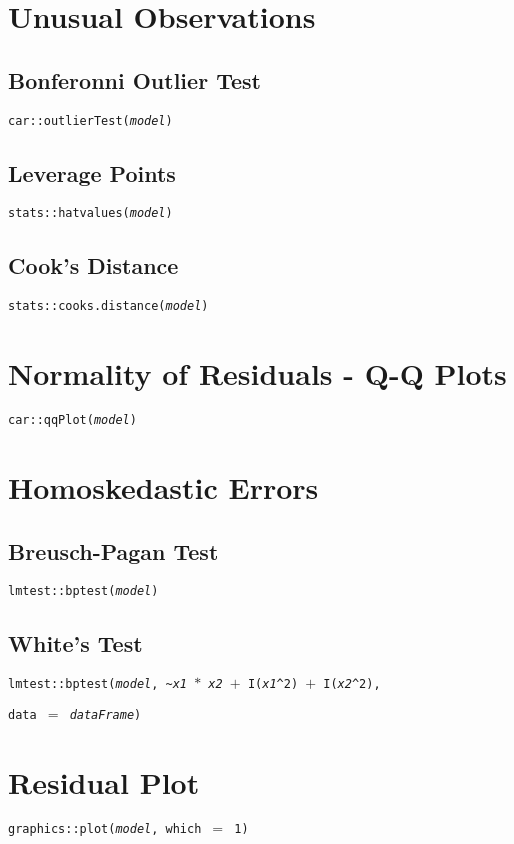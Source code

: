 \documentclass{tufte-handout}
\newenvironment{subs}
  {\adjustwidth{3em}{0pt}}
  {\endadjustwidth}
\begin{document}
\section{Unusual Observations}
\begin{subs}
\subsection{Bonferonni Outlier Test}
\noindent \texttt{car::}{\color{red}\texttt{outlierTest}}\texttt{(\textit{model})} 

\vspace{3mm}
\subsection{Leverage Points}
\noindent \texttt{stats::}{\color{red}\texttt{hatvalues}}\texttt{(\textit{model})} 

\vspace{3mm}
\subsection{Cook's Distance}
\noindent \texttt{stats::}{\color{red}\texttt{cooks.distance}}\texttt{(\textit{model})} 
\end{subs}

\vspace{5mm}
\section{Normality of Residuals - Q-Q Plots}
\noindent \texttt{car::}{\color{red}\texttt{qqPlot}}\texttt{(\textit{model})} 

\vspace{5mm}
\section{Homoskedastic Errors}
\begin{subs}
\subsection{Breusch-Pagan Test}
\noindent \texttt{lmtest::}{\color{red}\texttt{bptest}}\texttt{(\textit{model})} 

\vspace{3mm}
\subsection{White's Test}
\noindent \texttt{lmtest::}{\color{red}\texttt{bptest}}\texttt{(\textit{model}, \textasciitilde \textit{x1} $*$ \textit{x2} $+$ I(\textit{x1}\textasciicircum2) $+$ I(\textit{x2}\textasciicircum2),} 
\par \texttt{data $=$ \textit{dataFrame})}

\vspace{3mm}
\section{Residual Plot}
\noindent \texttt{graphics::}{\color{red}\texttt{plot}}\texttt{(\textit{model}, which $=$ 1)} 
\end{subs}
\end{document}
